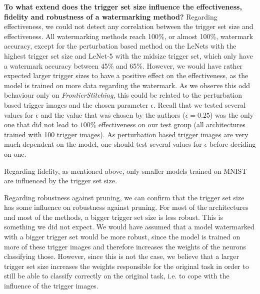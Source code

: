 \textbf{To what extend does the trigger set size influence the effectiveness, fidelity and robustness of a watermarking method?}
Regarding effectiveness, we could not detect any correlation between the trigger set size and effectiveness. All watermarking methods reach 100\%, or almost 100\%, watermark accuracy, except for the perturbation based method on the LeNets with the highest trigger set size and LeNet-5 with the midsize trigger set, which only have a watermark accuracy between 45\% and 65\%. However, we would have rather expected larger trigger sizes to have a positive effect on the effectiveness, as the model is trained on more data regarding the watermark. As we observe this odd behaviour only on \textit{FrontierStitching}, this could be related to the perturbation based trigger images and the chosen parameter $\epsilon$. Recall that we tested several values for $\epsilon$ and the value that was chosen by the authors ($\epsilon=0.25$) was the only one that did not lead to $100\%$ effectiveness on our test group (all architectures trained with 100 trigger images). As perturbation based trigger images are very much dependent on the model, one should test several values for $\epsilon$ before deciding on one.


Regarding fidelity, as mentioned above, only smaller models trained on MNIST are influenced by the trigger set size. 

Regarding robustness against pruning, we can confirm that the trigger set size has some influence on robustness against pruning. For most of the architectures and most of the methods, a bigger trigger set size is less robust. This is something we did not expect. We would have assumed that a model watermarked with a bigger trigger set would be more robust, since the model is trained on more of these trigger images and therefore increases the weights of the neurons classifying those. However, since this is not the case, we believe that a larger trigger set size increases the weights responsible for the original task in order to still be able to classify correctly on the original task, i.e. to cope with the influence of the trigger images.


